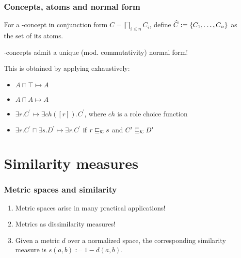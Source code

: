 \documentclass[smaller]{beamer}
\begin{document}
\begin{frame}
  \frametitle{Concepts, atoms and normal form}
  For a \elh-concept in conjunction form
  \(C = \bigsqcap_{i \le n} C_i\), define
  \(
    \widehat{C} := \lbrace C_1,\dotsc,C_n \rbrace
  \)
  as the set of its \alert{atoms}.

  \elh-concepts admit a unique (mod. commutativity) \alert{normal form}!

  This is obtained by applying exhaustively:
  \begin{itemize}[<+->]
    \item \(A \sqcap \top \mapsto A\)
    \item \(A \sqcap A \mapsto A\)
    \item \(\exists{}r.C^\prime \mapsto%
           \exists{}ch([r]).C^\prime\),
           where \(ch\) is a role choice function
    \item \(\exists{}r.C^\prime \sqcap%
           \exists{}s.D^\prime \mapsto%
          \exists{}r.C^\prime\) if
          \(r\sqsubseteq_{\mathcal{K}}s\) and
          \(C^\prime \sqsubseteq_{\mathcal{K}} D^\prime\)
  \end{itemize}
\end{frame}


\section{Similarity measures}

\begin{frame}
  \frametitle{Metric spaces and similarity}
  \begin{enumerate}
    \item Metric spaces arise in many practical
    applications!
    \item Metrics as \alert{dissimilarity} measures!
    \item Given a metric \(d\) over a normalized space,
    the corresponding \alert{similarity} measure is
    \(
      s(a,b) := 1 - d(a,b)
    \).
  \end{enumerate}  
\end{frame}
\end{document}

